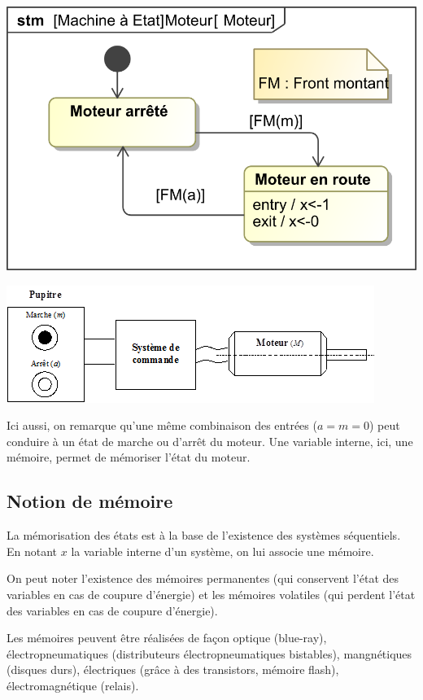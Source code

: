 \documentclass[10pt,fleqn]{article} %
\begin{document}
\begin{minipage}[c]{.47\linewidth}
\begin{center}
\includegraphics[width=.95\textwidth]{images/Moteur}

\includegraphics[width=.95\textwidth]{images/Moteur_im}
\end{center}
\end{minipage}

Ici aussi, on remarque qu'une même combinaison des entrées ($a=m=0$) peut conduire à un état de marche ou d'arrêt du moteur. Une variable interne, ici, une mémoire, permet de mémoriser l'état du moteur. 

\subsection{Notion de mémoire}

La mémorisation des états est à la base de l'existence des systèmes séquentiels. En notant $x$ la variable interne d'un système, on lui associe une mémoire.

 On peut noter l'existence des mémoires permanentes (qui conservent l'état des variables en cas de coupure d'énergie) et les mémoires volatiles (qui perdent l'état des variables en cas de coupure d'énergie).  
 
 Les mémoires peuvent être réalisées de façon optique (blue-ray), électropneumatiques (distributeurs électropneumatiques bistables), mangnétiques (disques durs), électriques (grâce à des transistors, mémoire flash), électromagnétique (relais). 
 
\end{document}
